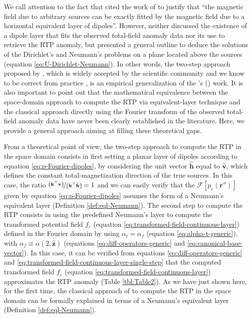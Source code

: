 \documentclass[manuscript,noblind]{geophysics}
\begin{document}
	We call attention to the fact that \citet{silva1986} cited the work of \citet{roy1962} to justify that ``the magnetic 
	field due to arbitrary sources can be exactly fitted by the magnetic field due to a horizontal equivalent
	layer of dipoles''. 
	However, \citeauthor{roy1962} neither discussed the existence of a dipole layer that fits the observed total-field 
	anomaly data nor its use to retrieve the RTP anomaly, but 
	presented a general outline to deduce the solutions of the Dirichlet's and Neumann's problems on a plane 
	located above the sources (equation \ref{eq:U-Dirichlet-Neumann}).
	In other words, the two-step approach proposed by \citet{silva1986}, which is widely accepted by the scientific community 
	and we know to be correct from practice 
	\citep[e.g., ][]{leao-silva_1989, guspi_novara2009, oliveirajr_etal2013, li_etal2014, reis_etal2020, takahashi-etal2022, piauilino_etal2025}, 
	is an empirical generalization of the \citeauthor{roy1962}'s (\citeyear{roy1962}) work. 
	It is also important to point out that the mathematical equivalence between the space-domain approach to compute the 
	RTP via equivalent-layer technique and the classical approach directly using the Fourier transform of the observed 
	total-field anomaly data \citep[e.g., ][ p. 331]{blakely1996} have never been clearly established in the literature.
	Here, we provide a general approach aiming at filling these theoretical gaps.
	
	From a theoretical point of view, the two-step approach to compute the RTP in the space domain 
	consists in first setting a planar layer of dipoles according to equation \ref{eq:p-Fourier-dipoles}, 
	by considering the unit vector $\hat{\mathbf{h}}$ equal to $\hat{\mathbf{v}}$, which defines 
	the constant total-magnetization direction of the true sources.
	In this case, the ratio $\nicefrac{\left(\mathbf{k}^{\top} \hat{\mathbf{v}} \right)}{\left(\mathbf{k}^{\top} \hat{\mathbf{h}} \right)} = 1$ 
	and we can easily verify that the $\mathcal{F} [ p_{\varepsilon}(\mathbf{r}'') ]$ given by 
	equation \ref{eq:p-Fourier-dipoles} assumes the form of a Neumann's equivalent layer (Definition \ref{def:eql-Neumann}).
	The second step to compute the RTP consists in using the predefined Neumann's layer to compute 
	the transformed potential field $f_{\varepsilon}$ (equation \ref{eq:transformed-field-continuous-layer}) defined in the Fourier domain 
	by using $\alpha_{t} = \alpha_{f}$ (equation \ref{eq:alpha-t-generic}), with 
	$\alpha_{f} \equiv \alpha(2, \hat{\mathbf{z}})$ (equations \ref{eq:diff-operators-generic} and \ref{eq:canonical-base-vector}).
	In this case, it can be verified from equations \ref{eq:diff-operators-generic} and \ref{eq:transformed-field-continuous-layer-single-step} 
	that the computed transformed field $f_{\varepsilon}$ (equation \ref{eq:transformed-field-continuous-layer}) 
	approximates the RTP anomaly  (Table \ref{tbl:Table2}). 
	As we have just shown here, for the first time, the classical approach of \citet{silva1986} to compute the RTP in the 
	space domain can be formally explained in terms of a Neumann's equivalent layer (Definition \ref{def:eql-Neumann}). 
	
\end{document}
